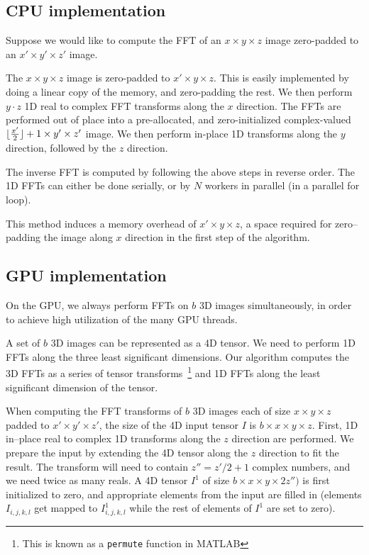 \documentclass[conference]{./IEEEtran}
\DeclarePairedDelimiter{\floor}{\lfloor}{\rfloor}
\begin{document}
  \subsection{CPU implementation}

  Suppose we would like to compute the FFT of an $x \times y \times z$
  image zero-padded to an $x' \times y' \times z'$ image.

  The $x \times y \times z$ image is zero-padded to $x' \times
  y \times z$.  This is easily implemented by doing a linear copy of
  the memory, and zero-padding the rest. We then perform $y \cdot z$
  1D real to complex FFT transforms along the $x$ direction.  The FFTs
  are performed out of place into a pre-allocated, and
  zero-initialized complex-valued $\floor{\frac{x'}{2}} + 1 \times
  y' \times z'$ image.  We then perform in-place 1D transforms along
  the $y$ direction, followed by the $z$ direction.

  The inverse FFT is computed by following the above steps in reverse
  order.  The 1D FFTs can either be done serially, or by $N$ workers
  in parallel (in a parallel for loop).

  This method induces a memory overhead of $x' \times y \times z$, a
  space required for zero--padding the image along $x$ direction in
  the first step of the algorithm.


  \subsection{GPU implementation}

  \label{sec:gpu-fft-impl}

  On the GPU, we always perform FFTs on $b$ 3D images simultaneously,
  in order to achieve high utilization of the many GPU threads.

  A set of $b$ 3D images can be represented as a 4D tensor.  We need
  to perform 1D FFTs along the three least significant dimensions.
  Our algorithm computes the 3D FFTs as a series of tensor
  transforms~\footnote{This is known as a \texttt{permute} function in
    MATLAB} and 1D FFTs along the least significant dimension of the
  tensor.

  When computing the FFT transforms of $b$ 3D images each of size $x
  \times y \times z$ padded to $x' \times y' \times z'$, the size of
  the 4D input tensor $I$ is $b \times x \times y \times z$.  First,
  1D in--place real to complex 1D transforms along the $z$ direction
  are performed.  We prepare the input by extending the 4D tensor
  along the $z$ direction to fit the result.  The transform will need
  to contain $z'' = z' / 2 + 1$ complex numbers, and we need twice as
  many reals.  A 4D tensor $I^1$ of size $b \times x \times y \times
  2z'')$ is first initialized to zero, and appropriate elements from
  the input are filled in (elements $I_{i,j,k,l}$ get mapped to
  $I^1_{i,j,k,l}$ while the rest of elements of $I^1$ are set to
  zero).
\end{document}
